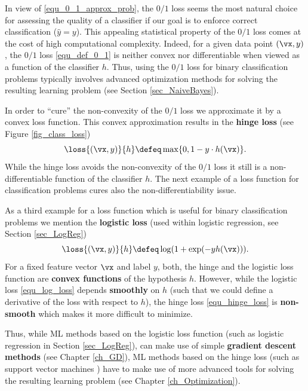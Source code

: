 \documentclass[12pt]{report}
\begin{document}
In view of \eqref{equ_0_1_approx_prob}, the $0/1$ loss seems the most natural choice for 
assessing the quality of a classifier if our goal is to enforce correct classification ($\hat{y}=y$). 
This appealing statistical property of the $0/1$ loss comes at the cost of high 
computational complexity. Indeed, for a given data point $(\vx,y)$, the $0/1$ loss 
\eqref{equ_def_0_1} is neither convex nor differentiable when viewed as a function of the 
classifier $h$. Thus, using the $0/1$ loss for binary classification problems typically involves 
advanced optimization methods for solving the resulting learning problem (see Section \ref{sec_NaiveBayes}). 

In order to ``cure'' the non-convexity of the $0/1$ loss we approximate it by a convex loss function. 
This convex approximation results in the {\bf hinge loss} (see Figure \ref{fig_class_loss}) 
\begin{equation} 
\label{equ_hinge_loss}
\loss{(\vx,y)}{h} \defeq \max \{ 0 , 1 - y\cdot h(\vx) \}. 
\end{equation}
While the hinge loss avoids the non-convexity of the $0/1$ loss it still is a non-differentiable 
function of the classifier $h$. The next example of a loss function for classification problems cures 
also the non-differentiability issue. 

As a third example for a loss function which is useful for binary classification problems 
we mention the {\bf logistic loss} (used within logistic regression, see Section \ref{sec_LogReg})
\begin{equation} 
\label{equ_log_loss}
\loss{(\vx,y)}{h} \defeq  \log ( 1 + \exp(- y h(\vx))). 
\end{equation}
For a fixed feature vector $\vx$ and label $y$, both, the hinge and the logistic 
loss function are {\bf convex functions} of the hypothesis $h$. However, while 
the logistic loss \eqref{equ_log_loss} depends {\bf smoothly} on $h$ (such that we 
could define a derivative of the loss with respect to $h$), the hinge loss \eqref{equ_hinge_loss} is 
{\bf non-smooth} which makes it more difficult to minimize. 

Thus, while ML methods based on the logistic loss function (such as logistic regression 
in Section \ref{sec_LogReg}), can make use of simple {\bf gradient descent methods} (see 
Chapter \ref{ch_GD}), ML methods based on the hinge loss (such as support vector 
machines \cite{hastie01statisticallearning}) have to make use of more advanced tools 
for solving the resulting learning problem (see Chapter \ref{ch_Optimization}).  
\end{document}
